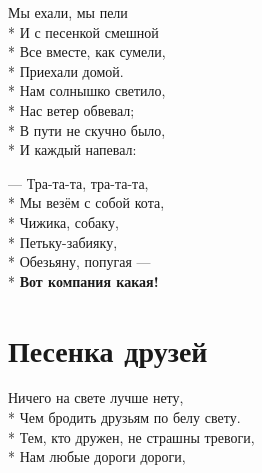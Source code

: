 \medskip

\begin{minipage}{\linewidth}
Мы ехали, мы пели\\*
И с песенкой смешной\\*
Все вместе, как сумели,\\*
Приехали домой.\\*
Нам солнышко светило,\\*
Нас ветер обвевал;\\*
В пути не скучно было,\\*
И каждый напевал:\\
\end{minipage}\par\medskip\nobreak

\medskip

\begin{minipage}{\linewidth}
\hspace*{1.5em}— Тра-та-та, тра-та-та,\\*
\hspace*{1.5em}Мы везём с собой кота,\\*
\hspace*{1.5em}Чижика, собаку,\\*
\hspace*{1.5em}Петьку-забияку,\\*
\hspace*{1.5em}Обезьяну, попугая —\\*
\hspace*{1.5em}\textbf{Вот компания какая!}\\
\end{minipage}

\vspace{\fill}\newpage

\section{Песенка друзей}
\label{song:Песенка_друзей}

\medskip

\begin{minipage}{\linewidth}
Ничего на свете лучше нету,\\*
Чем бродить друзьям по белу свету.\\*
Тем, кто дружен, не страшны тревоги,\\*
Нам любые дороги дороги,\\
\end{minipage}\par\medskip\nobreak

